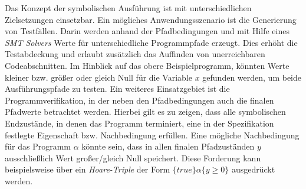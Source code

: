 Das Konzept der symbolischen Ausführung ist mit unterschiedlichen Zielsetzungen einsetzbar. Ein mögliches Anwendungsszenario ist die Generierung von Testfällen. Darin werden anhand der Pfadbedingungen und mit Hilfe eines \emph{SMT Solvers} Werte für unterschiedliche Programmpfade erzeugt. Dies erhöht die Testabdeckung und erlaubt zusätzlich das Auffinden von unerreichbaren Codeabschnitten. Im Hinblick auf das obere Beispielprogramm, könnten Werte kleiner bzw. größer oder gleich Null für die Variable $x$ gefunden werden, um beide Ausführungspfade zu testen. Ein weiteres Einsatzgebiet ist die Programmverifikation, in der neben den Pfadbedingungen auch die finalen Pfadwerte betrachtet werden. Hierbei gilt es zu zeigen, dass alle symbolischen Endzustände, in denen das Programm terminiert, eine in der Spezifikation festlegte Eigenschaft bzw. Nachbedingung erfüllen. Eine mögliche Nachbedingung für das Programm $\alpha$ könnte sein, dass in allen finalen Pfadzuständen $y$ ausschließlich Wert großer/gleich Null speichert. Diese Forderung kann beispielsweise über ein \emph{Hoare-Triple} der Form $\{true\}\alpha\{y \geq 0\}$ ausgedrückt werden.
